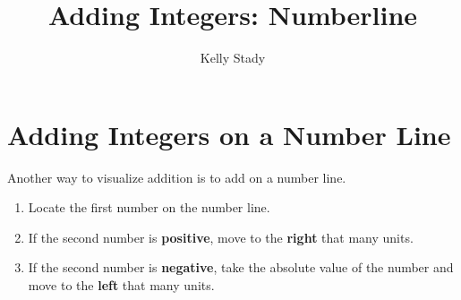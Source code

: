 \documentclass{ximera}[font=12pt]
\title{Adding Integers: Numberline}    %
\author{Kelly Stady}
\begin{document}
\begin{abstract}

\end{abstract}

\maketitle
\label{xim:AddIntNumLActivity}


\section*{Adding Integers on a Number Line}

Another way to visualize addition is to add on a number line.  

\begin{procedure}

\begin{enumerate}
\item Locate the first number on the number line.

\item If the second number is \textbf{positive}, move to the \textbf{right} that many units.

\item If the second number is \textbf{negative}, take the absolute value of the number and move to the \textbf{left} that many units.
\end{enumerate}
\end{procedure}
\end{document}
